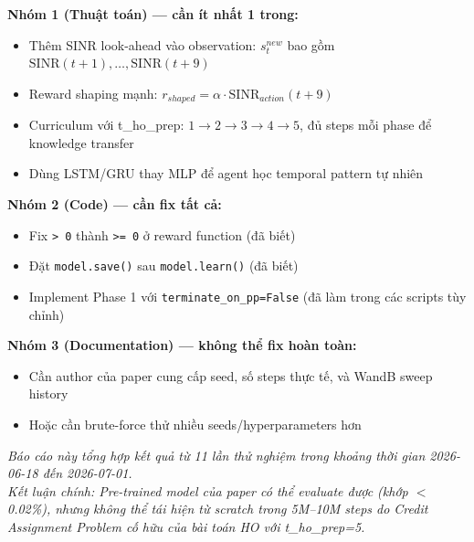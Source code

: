 \documentclass[11pt]{article}
\begin{document}
\textbf{Nhóm 1 (Thuật toán) --- cần ít nhất 1 trong:}
\begin{itemize}
  \item[$\square$] Thêm SINR look-ahead vào observation: $s_t^{new}$ bao gồm $\text{SINR}(t+1), \ldots, \text{SINR}(t+9)$
  \item[$\square$] Reward shaping mạnh: $r_{shaped} = \alpha \cdot \text{SINR}_{action}(t+9)$
  \item[$\square$] Curriculum với t\_ho\_prep: $1\to2\to3\to4\to5$, đủ steps mỗi phase để knowledge transfer
  \item[$\square$] Dùng LSTM/GRU thay MLP để agent học temporal pattern tự nhiên
\end{itemize}

\textbf{Nhóm 2 (Code) --- cần fix tất cả:}
\begin{itemize}
  \item[$\blacksquare$] Fix \texttt{> 0} thành \texttt{>= 0} ở reward function (đã biết)
  \item[$\blacksquare$] Đặt \texttt{model.save()} sau \texttt{model.learn()} (đã biết)
  \item[$\blacksquare$] Implement Phase 1 với \texttt{terminate\_on\_pp=False} (đã làm trong các scripts tùy chỉnh)
\end{itemize}

\textbf{Nhóm 3 (Documentation) --- không thể fix hoàn toàn:}
\begin{itemize}
  \item[$\square$] Cần author của paper cung cấp seed, số steps thực tế, và WandB sweep history
  \item[$\square$] Hoặc cần brute-force thử nhiều seeds/hyperparameters hơn
\end{itemize}

\bigskip
\textit{Báo cáo này tổng hợp kết quả từ 11 lần thử nghiệm trong khoảng thời gian 2026-06-18 đến 2026-07-01.}\\
\textit{Kết luận chính: Pre-trained model của paper có thể evaluate được (khớp $<$ 0.02\%), nhưng không thể tái hiện từ scratch trong 5M--10M steps do Credit Assignment Problem cố hữu của bài toán HO với t\_ho\_prep=5.}
\end{document}
